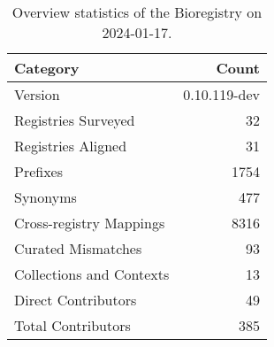 \begin{table}
\caption{Overview statistics of the Bioregistry on 2024-01-17.}
\label{tab:bioregistry-summary}
\begin{tabular}{lr}
\toprule
Category & Count \\
\midrule
Version & 0.10.119-dev \\
Registries Surveyed & 32 \\
Registries Aligned & 31 \\
Prefixes & 1754 \\
Synonyms & 477 \\
Cross-registry Mappings & 8316 \\
Curated Mismatches & 93 \\
Collections and Contexts & 13 \\
Direct Contributors & 49 \\
Total Contributors & 385 \\
\bottomrule
\end{tabular}
\end{table}
